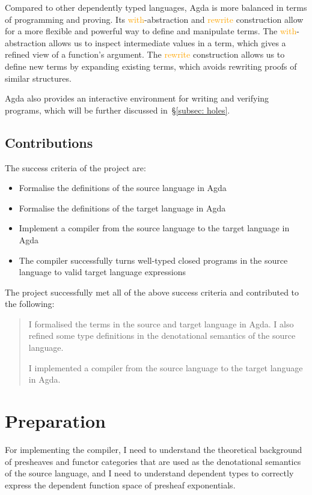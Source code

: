\documentclass[12pt,a4paper]{report}
\theoremstyle{definition}
\newcounter{motivation}
\newcommand{\secref}[1]{\S\ref{#1}}
\newcommand{\og}[1]{\textcolor{orange}{#1}}
\begin{document}
        Compared to other dependently typed languages, Agda is more balanced in terms of programming and proving. Its \og{\textsf{with}}-abstraction and \og{\textsf{rewrite}} construction allow for a more flexible and powerful way to define and manipulate terms. The \og{\textsf{with}}-abstraction allows us to inspect intermediate values in a term, which gives a refined view of a function's argument. The \og{\textsf{rewrite}} construction allows us to define new terms by expanding existing terms, which avoids rewriting proofs of similar structures.

        Agda also provides an interactive environment for writing and verifying programs, which will be further discussed in~\secref{subsec: holes}.

    \section{Contributions} \label{sec: contributions}
        The success criteria of the project are:
        \begin{itemize}
            \item 
                Formalise the definitions of the source language in Agda
            \item 
                Formalise the definitions of the target language in Agda
            \item
                Implement a compiler from the source language to the target language in Agda
            \item 
                The compiler successfully turns well-typed closed programs in the source language to valid target language expressions
        \end{itemize}

        The project successfully met all of the above success criteria and contributed to the following:
        \begin{quote}            
            \savedmotivationI
            I formalised the terms in the source and target language in Agda. I also refined some type definitions in the denotational semantics of the source language.
            \vspace*{1em}
            
            \savedmotivationII
            I implemented a compiler from the source language to the target language in Agda. 
        \end{quote}



\chapter{Preparation}
    \minitoc
    For implementing the compiler, I need to understand the theoretical background of presheaves and functor categories that are used as the denotational semantics of the source language, and I need to understand dependent types to correctly express the dependent function space of presheaf exponentials. 
    
\end{document}
